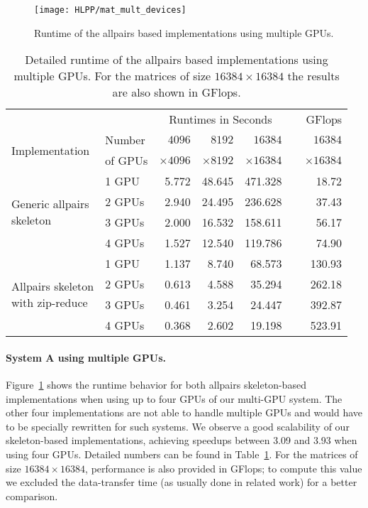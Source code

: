 \begin{figure}[b]
  \centering
  \texttt{[image: HLPP/mat\_mult\_devices]}
  \caption{Runtime of the allpairs based implementations using multiple GPUs.}
  \label{fig:mat_mult_devices}
\end{figure}
\begin{table}[b]
  \centering
  \begin{tabular}{llrrrcr}
    \toprule
              & & \multicolumn{3}{c}{Runtimes in Seconds} & & GFlops\\
    \cmidrule(r){3-5}
    \cmidrule(r){7-7}
    \multirow{2}{*}{Implementation}
     & Number    & $4096$ & $8192$ & $16384$ & & $16384$\\
     & of GPUs   & $\times 4096$ & $\times 8192$ & $ \times 16384$ & & $ \times 16384$\\
    \midrule
    \multirow{4}{*}{\parbox[t]{2.3cm}{Generic allpairs\\ skeleton}}
     & 1 GPU  & 5.772 & 48.645 & 471.328 &&  18.72\\
     & 2 GPUs & 2.940 & 24.495 & 236.628 &&  37.43\\
     & 3 GPUs & 2.000 & 16.532 & 158.611 &&  56.17\\
     & 4 GPUs & 1.527 & 12.540 & 119.786 &&  74.90\\[.5em]
    \multirow{4}{*}{\parbox[t]{2.3cm}{Allpairs skeleton\\ with zip-reduce}}
     & 1 GPU  & 1.137 &  8.740 &  68.573 && 130.93\\
     & 2 GPUs & 0.613 &  4.588 &  35.294 && 262.18\\
     & 3 GPUs & 0.461 &  3.254 &  24.447 && 392.87\\
     & 4 GPUs & 0.368 &  2.602 &  19.198 && 523.91\\
    \bottomrule
  \end{tabular}
  \caption{Detailed runtime of the allpairs based implementations using multiple GPUs.
    For the matrices of size $16384\times 16384$ the results are also shown in GFlops.}
  \label{tab:mat_mult_devices}
\end{table}

\paragraph{System A using multiple GPUs.}
Figure~\ref{fig:mat_mult_devices} shows the runtime behavior for both allpairs skeleton-based implementations when using up to four GPUs of our multi-GPU system.
The other four implementations are not able to handle multiple GPUs and would have to be specially rewritten for such systems.
We observe a good scalability of our skeleton-based implementations, achieving speedups between 3.09 and 3.93 when using four GPUs.
Detailed numbers can be found in Table~\ref{tab:mat_mult_devices}.
For the matrices of size $16384\times 16384$, performance is also provided in GFlops;
to compute this value we excluded the data-transfer time (as usually done in related work) for a better comparison.

